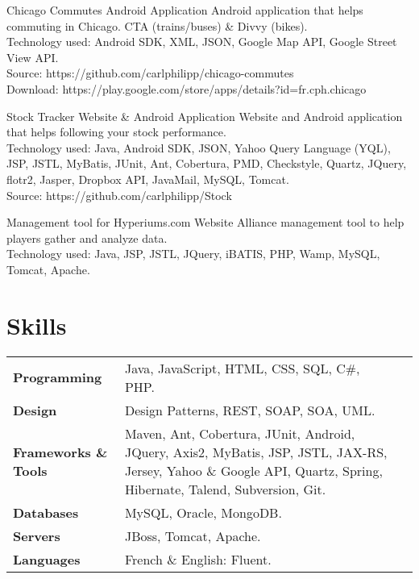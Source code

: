 \documentclass[12pt,a4paper]{moderncv}
\begin{document}
		{Chicago Commutes}
		{Android Application}{}
		{}
		{
		Android application that helps commuting in Chicago. CTA (trains/buses) \& Divvy (bikes).\\
	    Technology used: Android SDK, XML, JSON, Google Map API, Google Street View API.\\
	    \scriptsize{Source: https://github.com/carlphilipp/chicago-commutes\\
	    Download: https://play.google.com/store/apps/details?id=fr.cph.chicago}
		}{}

		{Stock Tracker}
		{Website \& Android Application}{}
		{}
		{
		Website and Android application that helps following your stock performance.\\
	    Technology used: Java, Android SDK, JSON, Yahoo Query Language (YQL), JSP, JSTL, MyBatis, JUnit, Ant, Cobertura, PMD, Checkstyle, Quartz, JQuery, flotr2, Jasper, Dropbox API, JavaMail, MySQL, Tomcat.\\
	    \scriptsize{Source: https://github.com/carlphilipp/Stock}
		}{}
		
		{Management tool for Hyperiums.com}
		{Website}{}
		{}
		{
		Alliance management tool to help players gather and analyze data.\\
	    Technology used: Java, JSP, JSTL, JQuery, iBATIS, PHP, Wamp, MySQL, Tomcat, Apache.
		}{}


\section{Skills}

%
%
\begin{tabularx}{1\textwidth}{ F S X }
    \textbf{Programming} & Java, JavaScript, HTML, CSS, SQL, C\#, PHP.\\
    \textbf{Design} & Design Patterns, REST, SOAP, SOA, UML.\\
    \textbf{Frameworks \& Tools} & Maven, Ant, Cobertura, JUnit, Android, JQuery, Axis2, MyBatis, JSP, JSTL, JAX-RS, Jersey, Yahoo \& Google API, Quartz, Spring, Hibernate, Talend, Subversion, Git.\\
    \textbf{Databases} & MySQL, Oracle, MongoDB.\\
    \textbf{Servers} & JBoss, Tomcat, Apache.\\
    \textbf{Languages} & French \& English: Fluent.\\
\end{tabularx}
\end{document}

